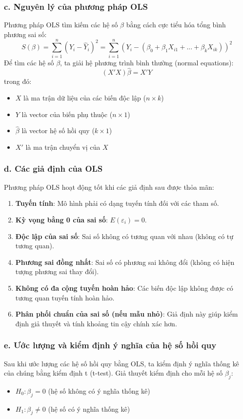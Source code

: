 \subsubsection{c. Nguyên lý của phương pháp OLS}
Phương pháp OLS tìm kiếm các hệ số $\beta$ bằng cách cực tiểu hóa tổng bình phương sai số:
\begin{equation}
S(\beta) = \sum_{i=1}^{n} (Y_i - \hat{Y}_i)^2 = \sum_{i=1}^{n} (Y_i - (\beta_0 + \beta_1 X_{i1} + ... + \beta_k X_{ik}))^2
\end{equation}
Để tìm các hệ số $\beta$, ta giải hệ phương trình bình thường (normal equations):
\begin{equation}
(X'X)\hat{\beta} = X'Y
\end{equation}
trong đó:
\begin{itemize}
    \item $X$ là ma trận dữ liệu của các biến độc lập ($n \times k$)
    \item $Y$ là vector của biến phụ thuộc ($n \times 1$)
    \item $\hat{\beta}$ là vector hệ số hồi quy ($k \times 1$)
    \item $X'$ là ma trận chuyển vị của $X$
\end{itemize}

\subsubsection{d. Các giả định của OLS}
Phương pháp OLS hoạt động tốt khi các giả định sau được thỏa mãn:
\begin{enumerate}
    \item \textbf{Tuyến tính}: Mô hình phải có dạng tuyến tính đối với các tham số.
    \item \textbf{Kỳ vọng bằng 0 của sai số}: $E(\varepsilon_i) = 0$.
    \item \textbf{Độc lập của sai số}: Sai số không có tương quan với nhau (không có tự tương quan).
    \item \textbf{Phương sai đồng nhất}: Sai số có phương sai không đổi (không có hiện tượng phương sai thay đổi).
    \item \textbf{Không có đa cộng tuyến hoàn hảo}: Các biến độc lập không được có tương quan tuyến tính hoàn hảo.
    \item \textbf{Phân phối chuẩn của sai số (nếu mẫu nhỏ)}: Giả định này giúp kiểm định giả thuyết và tính khoảng tin cậy chính xác hơn.
\end{enumerate}

\subsubsection{e. Ước lượng và kiểm định ý nghĩa của hệ số hồi quy}
Sau khi ước lượng các hệ số hồi quy bằng OLS, ta kiểm định ý nghĩa thống kê của chúng bằng kiểm định t (t-test). Giả thuyết kiểm định cho mỗi hệ số $\beta_j$:
\begin{itemize}
    \item $H_0: \beta_j = 0$ (hệ số không có ý nghĩa thống kê)
    \item $H_1: \beta_j \neq 0$ (hệ số có ý nghĩa thống kê)
\end{itemize}

